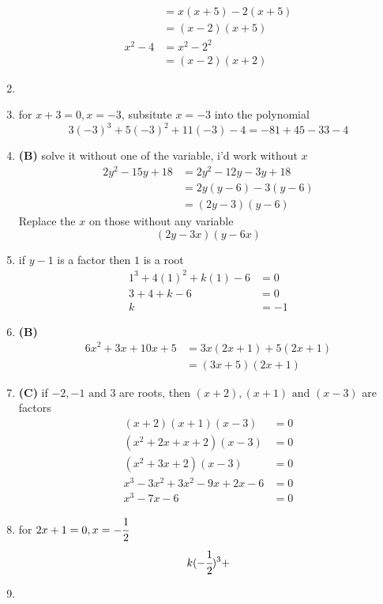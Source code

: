 \begin{multicols}{2}
\begin{enumerate}[label={\textbf{\arabic*.}}]
\begin{align*}
        &= x(x+5) - 2(x+5) \\ 
        &= (x-2)(x+5) \\
        x^2 - 4 &= x^2 - 2^2 \\ 
        &= (x-2)(x+2)
        \end{align*}    
\item 
\item for $x+3 = 0 , x = -3$, subsitute $x=-3$ into the polynomial \\
    $$3(-3)^3 + 5(-3)^2 + 11(-3) - 4 = -81 + 45 -33 - 4$$ 
    \item \textbf{(B)} solve it without one of the variable, i'd work without $x$ 
    \begin{align*}
    2y^2 - 15y + 18 &= 2y^2 -12y - 3y + 18  \\ 
    &= 2y(y-6) -3(y-6)  \\ 
    &= (2y-3)(y-6)
    \end{align*}
    Replace the $x$ on those without any variable 
    $$(2y-3x)(y-6x)$$
    \item if $y-1$ is a factor then $1$ is a root 
    \begin{align*}
    1^3 + 4(1)^2 + k(1) - 6 &= 0 \\
    3+ 4 + k - 6 &= 0 \\
    k & = -1
    \end{align*}
    \item \textbf{(B)} 
    \begin{align*} 6x^2 + 3x + 10x + 5 &= 3x(2x + 1) + 5(2x+1) \\ &= (3x+5)(2x+1) \end{align*}
    \item \textbf{(C)} if $-2, -1 \text{ and } 3$ are roots, then $(x+2), (x+1) \text{ and } (x-3)$ are factors 
        \begin{align*} 
            (x+2)(x+1)(x-3) &= 0 \\
            (x^2 + 2x + x + 2)(x-3) &= 0 \\
            (x^2 + 3x + 2)(x-3) &= 0 \\
            x^3 - 3x^2 +3x^2 - 9x + 2x -6 & = 0 \\
            x^3 -7x -6 & = 0 
        \end{align*}
    \item for $2x+1 = 0, x = -\cfrac{1}{2}$ \\
    \begin{align*} 
        k(-\cfrac{1}{2})^3 + 
    \end{align*}
    \item

\end{enumerate}
\end{multicols}
